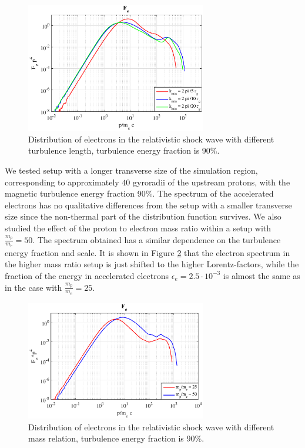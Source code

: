\documentclass[a4paper]{jpconf}
\begin{document}
\begin{figure}[h!]
	\centering
	\includegraphics[width=0.7\textwidth]{fig/spectrum_length.eps} 
	\caption{Distribution of electrons in the relativistic shock wave with different turbulence length, turbulence energy fraction is 90\%.}
	\label{spectrum_length}
\end{figure} 

We tested setup with a longer transverse size of the simulation region, corresponding to approximately $40$ gyroradii of the upstream protons, with the magnetic turbulence energy fraction 90\%. The spectrum of the accelerated electrons has no qualitative differences from the setup with a smaller transverse size since the non-thermal part of the distribution function survives.  We also studied the effect of the proton to electron  mass ratio within a setup with  $\frac{m_p}{m_e} = 50$. The spectrum obtained has a similar dependence on the turbulence energy fraction and scale. It is shown in Figure \ref{electrons_mass} that the electron spectrum in the higher mass ratio setup is just shifted to the higher Lorentz-factors, while  the fraction of the energy in accelerated electrons  $\epsilon_e = 2.5\cdot10^{-3}$ is almost the same as in the case with $\frac{m_p}{m_e} = 25$.

\begin{figure}[h!]
	\centering
	\includegraphics[width=0.7\textwidth]{fig/electrons_mass.eps} 
	\caption{Distribution of electrons in the relativistic shock wave with different mass relation, turbulence energy fraction is 90\%.}
	\label{electrons_mass}
\end{figure} 
\end{document}
